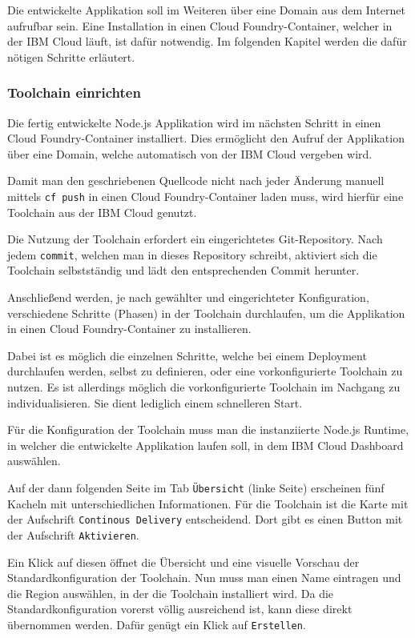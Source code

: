 Die entwickelte Applikation soll im Weiteren über eine Domain aus dem Internet aufrufbar sein. Eine Installation in
einen Cloud Foundry-Container, welcher in der IBM Cloud läuft, ist dafür notwendig. Im folgenden Kapitel werden die dafür
nötigen Schritte erläutert.

\subsubsection{Toolchain einrichten}
Die fertig entwickelte Node.js Applikation wird im nächsten Schritt in einen Cloud Foundry-Container installiert. Dies
ermöglicht den Aufruf der Applikation über eine Domain, welche automatisch von der IBM Cloud vergeben wird.

Damit man den geschriebenen Quellcode nicht nach jeder Änderung manuell mittels \texttt{cf push} in einen Cloud
Foundry-Container laden muss, wird hierfür eine Toolchain aus der IBM Cloud genutzt.

Die Nutzung der Toolchain erfordert ein eingerichtetes Git-Repository. Nach jedem \texttt{commit}, welchen man in dieses
Repository schreibt, aktiviert sich die Toolchain selbstständig und lädt den entsprechenden Commit herunter.

Anschließend werden, je nach gewählter und eingerichteter Konfiguration, verschiedene Schritte (Phasen) in der Toolchain
durchlaufen, um die Applikation in einen Cloud Foundry-Container zu installieren.

Dabei ist es möglich die einzelnen Schritte, welche bei einem Deployment durchlaufen werden, selbst zu definieren, oder
eine vorkonfigurierte Toolchain zu nutzen. Es ist allerdings möglich die vorkonfigurierte Toolchain im Nachgang zu
individualisieren. Sie dient lediglich einem schnelleren Start.

Für die Konfiguration der Toolchain muss man die instanziierte Node.js Runtime, in welcher die entwickelte Applikation
laufen soll, in dem IBM Cloud Dashboard auswählen.

Auf der dann folgenden Seite im Tab \texttt{Übersicht} (linke Seite) erscheinen fünf Kacheln mit unterschiedlichen
Informationen. Für die Toolchain ist die Karte mit der Aufschrift \texttt{Continous Delivery} entscheidend. Dort gibt es
einen Button mit der Aufschrift \texttt{Aktivieren}.

Ein Klick auf diesen öffnet die Übersicht und eine visuelle Vorschau der Standardkonfiguration der Toolchain. Nun muss
man einen Name eintragen und die Region auswählen, in der die Toolchain installiert wird. Da die Standardkonfiguration
vorerst völlig ausreichend ist, kann diese direkt übernommen werden. Dafür genügt ein Klick auf \texttt{Erstellen}.

